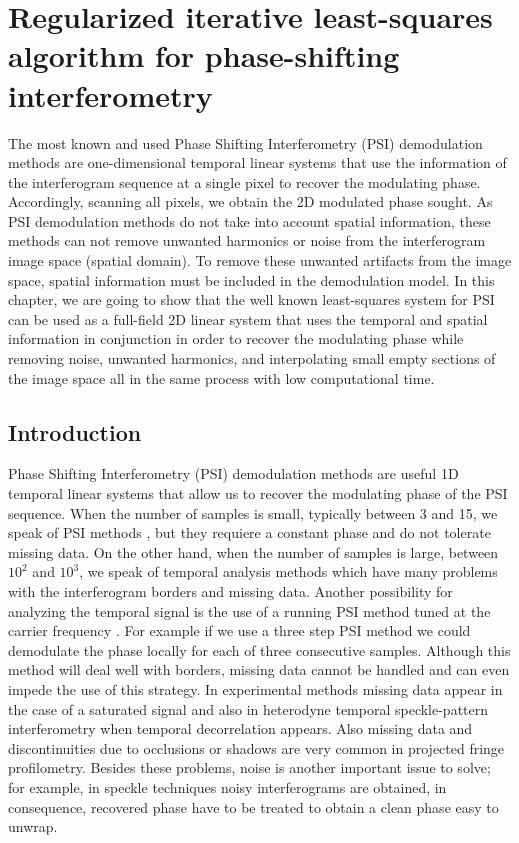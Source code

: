 \chapter{Regularized iterative least-squares algorithm for phase-shifting
interferometry}

The most known and used Phase Shifting Interferometry (PSI) demodulation methods 
are one-dimensional temporal linear systems that use the information of the 
interferogram sequence at a single pixel to recover the modulating phase. 
Accordingly, scanning all pixels, we obtain the 2D modulated phase sought. 
As PSI demodulation methods do not take into account spatial information, 
these methods can not remove unwanted harmonics or noise from the interferogram 
image space (spatial domain). To remove these unwanted artifacts from the image 
space, spatial information must be included in the demodulation model. In this 
chapter, we are going to show that the well known least-squares system for PSI 
can be used as a full-field 2D linear system that uses the temporal and spatial 
information in conjunction in order to recover the modulating phase while removing noise, 
unwanted harmonics, and interpolating small empty sections of the image space all
in the same process with low computational time.


\section{Introduction}

Phase Shifting Interferometry (PSI) demodulation methods are useful 1D
temporal linear systems that allow us to recover the modulating phase of the
PSI sequence. When the number of samples is small, typically between 3 and 15,
we speak of PSI methods \cite{Malacara,GeneralTheory}, but they requiere a
constant phase and do not tolerate missing data. On the other hand, when the
number of samples is large, between $10^2$ and $10^3$, we speak of temporal
analysis methods \cite{RQF,temporal_1,temporal_2} which have many problems with
the interferogram borders and missing data. Another possibility for analyzing
the temporal signal is the use of a running PSI method tuned at the carrier
frequency \cite{RQF,temporal_1,temporal_2,Mariano2,Medina,Zeng}. For example if
we use a three step PSI method we could demodulate the phase locally for each of
three consecutive samples. Although this method will deal well with borders,
missing data cannot be handled and can even impede the use of this strategy. In
experimental methods missing data appear in the case of a saturated signal and
also in heterodyne temporal speckle-pattern interferometry when temporal
decorrelation appears. Also missing data and discontinuities due to occlusions
or shadows are very common in projected fringe profilometry. Besides these
problems, noise is another important issue to solve; for example, in speckle
techniques \cite{Malacara,temporal_2} noisy interferograms are obtained, in
consequence, recovered phase have to be treated to obtain a clean phase easy to
unwrap.

